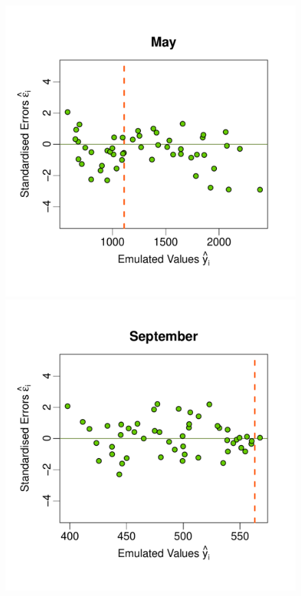 \documentclass[a4paper, 12pt]{article}
\begin{document}
\begin{figure}
 \includegraphics[width=\scale]{Validation_Plots/Evaluation_Set/Evaluation_Scatter_05_May}\hspace{-1ex}
 \includegraphics[width=\scale]{Validation_Plots/Evaluation_Set/Evaluation_Scatter_09_Sep}\\[-3ex]

\end{figure}
\end{document}
